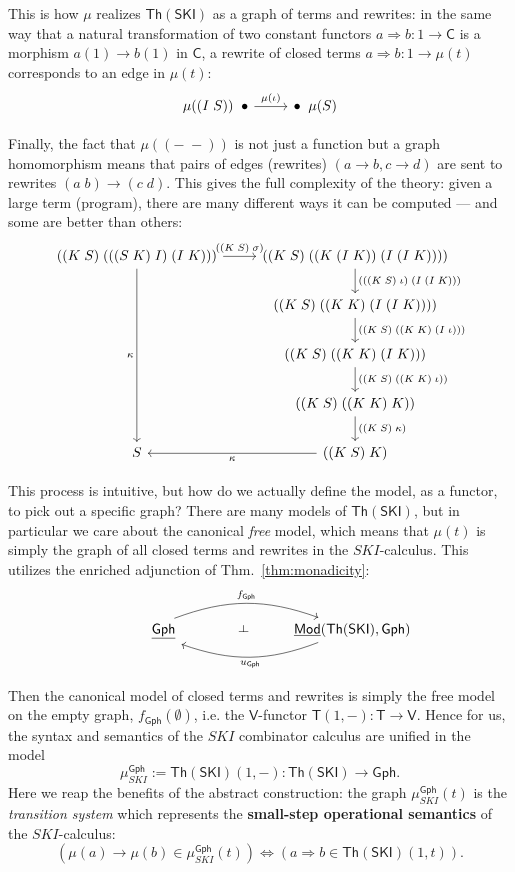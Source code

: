\documentclass{amsart}
\theoremstyle{definition}
\def\ld{\rotatebox[origin=c]{-90}{$\dashv$}} %
\newcommand{\Th}{\mathsf{Th}}
\newcommand{\Gph}{\mathsf{Gph}}
\newcommand{\Mod}{\mathsf{Mod}}
\newcommand{\V}{\mathsf{V}}
\newcommand{\C}{\mathsf{C}}
\newcommand{\T}{\mathsf{T}}
\newcommand{\maps}{\colon}
\begin{document}
This is how $\mu$ realizes $\Th(\mathsf{SKI})$ as a graph of terms and rewrites: in the same way that a natural transformation of two constant functors $a\Rightarrow b\maps 1\to \C$ is a morphism $a(1)\to b(1)$ in $\C$, a rewrite of closed terms $a\Rightarrow b\maps 1\to \mu(t)$ corresponds to an edge in $\mu(t)$:
\[\begin{tikzcd}
	\mu((I\; S)) \;\; \bullet \arrow[r,"\mu(\iota)"] & \bullet \;\; \mu(S)
\end{tikzcd}\]

Finally, the fact that $\mu((-\;-))$ is not just a function but a graph homomorphism means that pairs of edges (rewrites) $(a\to b, c\to d)$ are sent to rewrites $(a\; b) \to (c\; d)$. This gives the full complexity of the theory: given a large term (program), there are many different ways it can be computed --- and some are better than others:
\[\begin{tikzcd}
	((K\; S)\; (((S\; K)\; I)\; (I\; K))) \arrow[r,"((K\; S)\; \sigma)"] \arrow[dddd,swap,"\kappa"] & ((K\; S)\; ((K\;(I\; K))\; (I\; (I\; K)))) \arrow[d,"(((K\; S)\; \iota)\; (I\; (I\; K)))"]\\
	& ((K\; S)\; ((K\; K)\; (I\; (I\; K)))) \arrow[d,"((K\; S)\; ((K\; K)\; (I\; \iota)))"]\\
	& ((K\; S)\; ((K\; K)\; (I\; K))) \arrow[d,"((K\; S)\; ((K\; K)\; \iota))"]\\
	& ((K\; S)\; ((K\; K)\; K)) \arrow[d,"((K\; S)\; \kappa)"]\\
	S & ((K\; S)\; K)\arrow[l,"\kappa"]
\end{tikzcd}\]

This process is intuitive, but how do we actually define the model, as a functor, to pick out a specific graph? There are many models of $\Th(\mathsf{SKI})$, but in particular we care about the canonical \textit{free} model, which means that $\mu(t)$ is simply the graph of all closed terms and rewrites in the $SKI$-calculus. This utilizes the enriched adjunction of Thm.\ \ref{thm:monadicity}:
\[\begin{tikzcd}
\phantom{AAAA} \underline{\Gph} \arrow[bend left=20,"f_\Gph"]{rr}
& {\phantom{Aa} \ld} &
\arrow[bend left=20,"u_\Gph"]{ll} \underline{\Mod}(\Th(\mathsf{SKI}),\Gph)
\end{tikzcd}\]

Then the canonical model of closed terms and rewrites is simply the free model on the empty graph, $f_\Gph(\emptyset)$, i.e. the $\V$-functor $\T(1,-)\maps\T\to \V$. Hence for us, the syntax and semantics of the $SKI$ combinator calculus are unified in the model $$\mu_{SKI}^\Gph:= \Th(\mathsf{SKI})(1,-)\maps \Th(\mathsf{SKI}) \to \Gph.$$ Here we reap the benefits of the abstract construction: the graph $\mu_{SKI}^\Gph(t)$ is the \textit{transition system} which represents the \textbf{small-step operational semantics} of the $SKI$-calculus: $$(\mu(a) \to \mu(b) \in \mu_{SKI}^\Gph(t)) \iff (a \Rightarrow b \in \Th(\mathsf{SKI})(1,t)).$$
\end{document}
